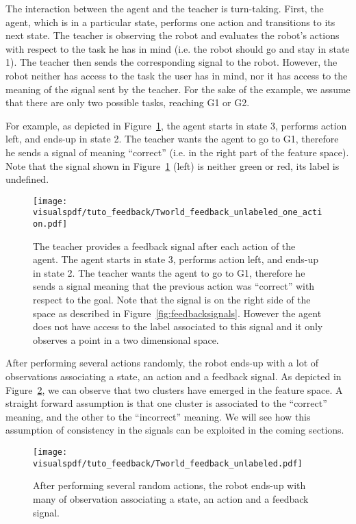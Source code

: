 The interaction between the agent and the teacher is turn-taking. First, the agent, which is in a particular state, performs one action and transitions to its next state. The teacher is observing the robot and evaluates the robot's actions with respect to the task he has in mind (i.e. the robot should go and stay in state 1). The teacher then sends the corresponding signal to the robot. However, the robot neither has access to the task the user has in mind, nor it has access to the meaning of the signal sent by the teacher. For the sake of the example, we assume that there are only two possible tasks, reaching G1 or G2.

For example, as depicted in Figure~\ref{fig:TworldOneStepUnlabeled}, the agent starts in state 3, performs action left, and ends-up in state 2. The teacher wants the agent to go to G1, therefore he sends a signal of meaning ``correct'' (i.e. in the right part of the feature space). Note that the signal shown in Figure~\ref{fig:TworldOneStepUnlabeled} (left) is neither green or red, its label is undefined.

\begin{figure}[!htbp]
  \centering
  \texttt{[image: \\visualspdf/tuto\_feedback/Tworld\_feedback\_unlabeled\_one\_action.pdf]}
  \caption{The teacher provides a feedback signal after each action of the agent. The agent starts in state 3, performs action left, and ends-up in state 2. The teacher wants the agent to go to G1, therefore he sends a signal meaning that the previous action was ``correct'' with respect to the goal. Note that the signal is on the right side of the space as described in Figure~\ref{fig:feedbacksignals}. However the agent does not have access to the label associated to this signal and it only observes a point in a two dimensional space.}
  \label{fig:TworldOneStepUnlabeled}
\end{figure}

After performing several actions randomly, the robot ends-up with a lot of observations associating a state, an action and a feedback signal. As depicted in Figure~\ref{fig:TworldManyStepUnlabeled}, we can observe that two clusters have emerged in the feature space. A straight forward assumption is that one cluster is associated to the ``correct'' meaning, and the other to the ``incorrect'' meaning. We will see how this assumption of consistency in the signals can be exploited in the coming sections.

\begin{figure}[!htbp]
  \centering
  \texttt{[image: \\visualspdf/tuto\_feedback/Tworld\_feedback\_unlabeled.pdf]}
  \caption{After performing several random actions, the robot ends-up with many of observation associating a state, an action and a feedback signal.}
  \label{fig:TworldManyStepUnlabeled}
\end{figure}


